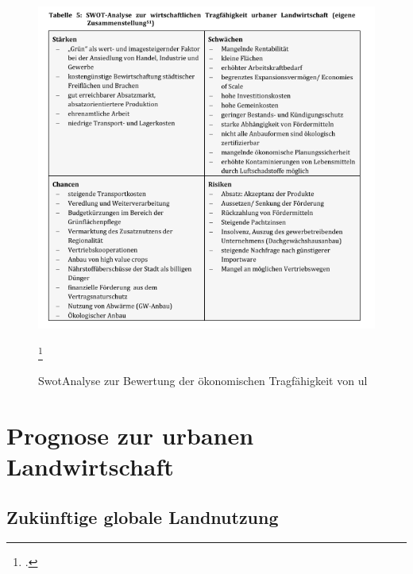 \documentclass{scrartcl}
\begin{document}
\begin{figure}[htbp]
\centering
\includegraphics[width=14cm]{image_folder/swot_kSchulz.png}
\caption{SwotAnalyse zur Bewertung der ökonomischen Tragfähigkeit von \acs{ul}}
\label{fig:SwotUL}\footcite[S.32]{Schulz2013UrbaneLandmanagements}
\end{figure} 
 
\section{Prognose zur urbanen Landwirtschaft}


\subsection{Zukünftige globale Landnutzung}
\end{document}
